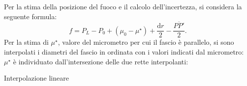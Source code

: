 
Per la stima della posizione del fuoco e il calcolo dell'incertezza, si considera la seguente formula:
\begin{equation} 
f = P_L - P_0 + \left(\mu _0 - \mu ^{\star}\right) + \frac{\mathrm{d}r}{2} - \frac{\overline{PP'}}{2}.
\end{equation}
Per la stima di $ \mu ^{\star} $, valore del micrometro per cui il fascio \`e parallelo, si sono interpolati i diametri del fascio in ordinata con i valori indicati dal micrometro: $ \mu ^{\star}$ \`e individuato dall'intersezione delle due rette interpolanti:

\begin{grafico} \centering  \caption{Interpolazione lineare} \label{gr:01_graph_1.tex} \end{grafico}

